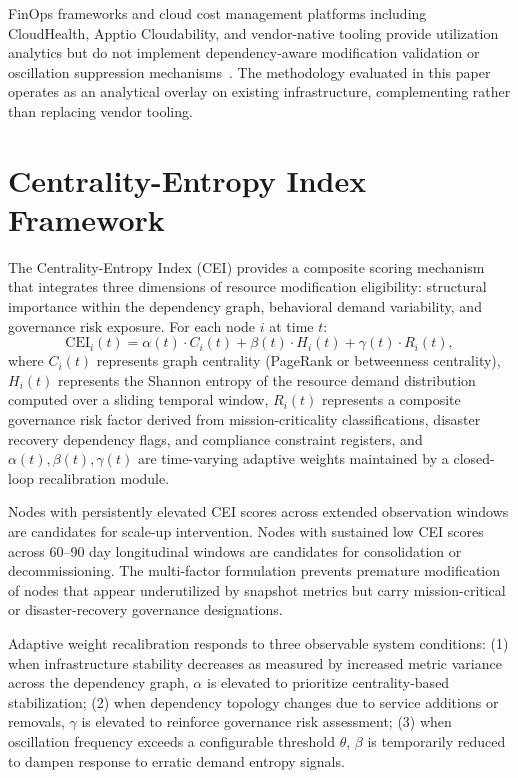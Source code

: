 \documentclass[runningheads]{llncs}
\begin{document}
FinOps frameworks and cloud cost management platforms including CloudHealth, Apptio Cloudability, and vendor-native tooling provide utilization analytics but do not implement dependency-aware modification validation or oscillation suppression mechanisms~\cite{finops}. The methodology evaluated in this paper operates as an analytical overlay on existing infrastructure, complementing rather than replacing vendor tooling.

\section{Centrality-Entropy Index Framework}
\label{sec:framework}

The Centrality-Entropy Index (CEI) provides a composite scoring mechanism that integrates three dimensions of resource modification eligibility: structural importance within the dependency graph, behavioral demand variability, and governance risk exposure. For each node $i$ at time $t$:
\begin{equation}
\text{CEI}_i(t) = \alpha(t) \cdot C_i(t) + \beta(t) \cdot H_i(t) + \gamma(t) \cdot R_i(t),
\label{eq:cei}
\end{equation}
where $C_i(t)$ represents graph centrality (PageRank or betweenness centrality), $H_i(t)$ represents the Shannon entropy of the resource demand distribution computed over a sliding temporal window, $R_i(t)$ represents a composite governance risk factor derived from mission-criticality classifications, disaster recovery dependency flags, and compliance constraint registers, and $\alpha(t), \beta(t), \gamma(t)$ are time-varying adaptive weights maintained by a closed-loop recalibration module.

Nodes with persistently elevated CEI scores across extended observation windows are candidates for scale-up intervention. Nodes with sustained low CEI scores across 60--90 day longitudinal windows are candidates for consolidation or decommissioning. The multi-factor formulation prevents premature modification of nodes that appear underutilized by snapshot metrics but carry mission-critical or disaster-recovery governance designations.

Adaptive weight recalibration responds to three observable system conditions: (1) when infrastructure stability decreases as measured by increased metric variance across the dependency graph, $\alpha$ is elevated to prioritize centrality-based stabilization; (2) when dependency topology changes due to service additions or removals, $\gamma$ is elevated to reinforce governance risk assessment; (3) when oscillation frequency exceeds a configurable threshold $\theta$, $\beta$ is temporarily reduced to dampen response to erratic demand entropy signals.
\end{document}
